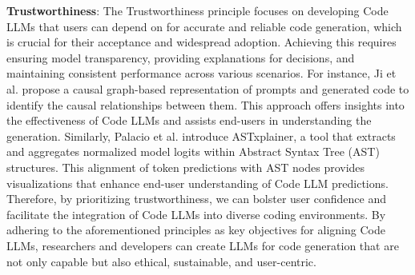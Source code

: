 \textbf{Trustworthiness}: 
The Trustworthiness principle focuses on developing Code LLMs that users can depend on for accurate and reliable code generation, which is crucial for their acceptance and widespread adoption. 
Achieving this requires ensuring model transparency, providing explanations for decisions, and maintaining consistent performance across various scenarios.
For instance, Ji et al. \cite{ji2023benchmarking} propose a causal graph-based representation of prompts and generated code to identify the causal relationships between them. This approach offers insights into the effectiveness of Code LLMs and assists end-users in understanding the generation. 
Similarly, Palacio et al. \cite{palacio2023evaluating} introduce ASTxplainer, a tool that extracts and aggregates normalized model logits within Abstract Syntax Tree (AST) structures. This alignment of token predictions with AST nodes provides visualizations that enhance end-user understanding of Code LLM predictions.
Therefore, by prioritizing trustworthiness, we can bolster user confidence and facilitate the integration of Code LLMs into diverse coding environments.
By adhering to the aforementioned principles as key objectives for aligning Code LLMs, researchers and developers can create LLMs for code generation that are not only capable but also ethical, sustainable, and user-centric.







